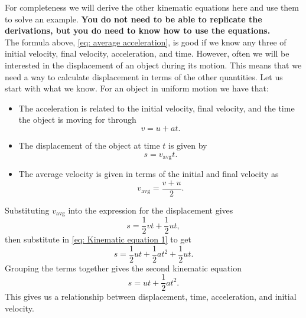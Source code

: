 \documentclass[a4paper,12pt]{book}
\begin{document}
For completeness we will derive the other kinematic equations here and use them to solve an example. \textbf{You do not need to be able to replicate the derivations, but you do need to know how to use the equations.}\\

The formula above, \cref{eq: average acceleration}, is good if we know any three of initial velocity, final velocity, acceleration, and time. However, often we will be interested in the displacement of an object during its motion. This means that we need a way to calculate displacement in terms of the other quantities.  Let us start with what we know. For an object in uniform motion we have that:
\begin{itemize}
\setlength{\itemsep}{-5pt}
    \item The acceleration is related to the initial velocity, final velocity, and the time the object is moving for through
    \begin{equation*}
        v=u+at.
    \end{equation*}
    \item The displacement of the object at time $t$ is given by
    \begin{equation*}
        s=v_{\text{avg}}t.
    \end{equation*}
    \item The average velocity is given in terms of the initial and final velocity as 
    \begin{equation*}
        v_{\text{avg}}=\frac{v+u}{2}.
    \end{equation*}
\end{itemize}
Substituting $v_{\text{avg}}$ into the expression for the displacement gives
\begin{equation*}
    s=\frac{1}{2}vt+\frac{1}{2}ut,
\end{equation*}
then substitute in \cref{eq: Kinematic equation 1} to get
\begin{equation*}
    s=\frac{1}{2}ut+\frac{1}{2}at^{2}+\frac{1}{2}ut.
\end{equation*}
Grouping the terms together gives the second kinematic equation
\begin{equation}
    s=ut+\frac{1}{2}at^{2}.
    \label{eq: Kinematic equation 2}
\end{equation}
This gives us a relationship between displacement, time, acceleration, and initial velocity.
\end{document}
